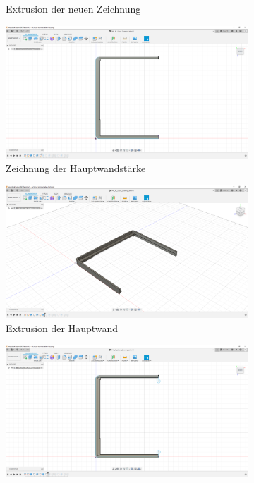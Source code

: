 \begin{figure}[H]
\begin{subfigure}[t]{.3\linewidth}
		\caption[Extrusion der neuen Zeichnung]{Extrusion der neuen Zeichnung}
		\label{fig:design-left-03}
	\end{subfigure}
	\begin{subfigure}[t]{.3\linewidth}
		\includegraphics[width=\linewidth]{img/konstruktion_gehaeuse_links_004.png}
		\caption[Zeichnung der Hauptwandstärke]{Zeichnung der Hauptwandstärke}
		\label{fig:design-left-04}
	\end{subfigure}
	\begin{subfigure}[t]{.3\linewidth}
		\includegraphics[width=\linewidth]{img/konstruktion_gehaeuse_links_005.png}
		\caption[Extrusion der Hauptwand]{Extrusion der Hauptwand}
		\label{fig:design-left-05}
	\end{subfigure}
	\begin{subfigure}[t]{.3\linewidth}
		\includegraphics[width=\linewidth]{img/konstruktion_gehaeuse_links_006.png}

\end{subfigure}
\end{figure}
